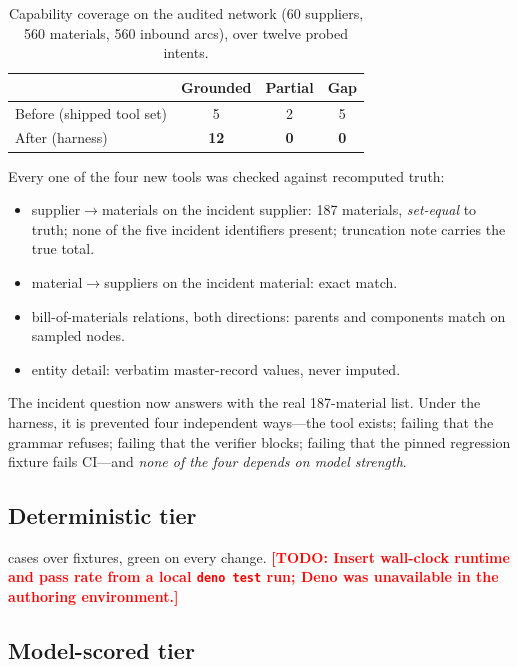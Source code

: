 \documentclass[conference]{IEEEtran}
\newcommand{\TODO}[1]{\textcolor{red}{\textbf{[TODO: #1]}}}
\begin{document}
\begin{table}[t]
\caption{Capability coverage on the audited network (60 suppliers, 560
         materials, 560 inbound arcs), over twelve probed intents.}
\label{tab:coverage}
\centering
\footnotesize
\begin{tabular}{@{}lccc@{}}
\toprule
& \textbf{Grounded} & \textbf{Partial} & \textbf{Gap} \\
\midrule
Before (shipped tool set) & 5  & 2 & 5 \\
After  (harness)          & \textbf{12} & \textbf{0} & \textbf{0} \\
\bottomrule
\end{tabular}
\end{table}

Every one of the four new tools was checked against recomputed truth:

\begin{itemize}
  \item supplier$\rightarrow$materials on the incident supplier: 187 materials,
        \emph{set-equal} to truth; none of the five incident identifiers present;
        truncation note carries the true total.
  \item material$\rightarrow$suppliers on the incident material: exact match.
  \item bill-of-materials relations, both directions: parents and components
        match on sampled nodes.
  \item entity detail: verbatim master-record values, never imputed.
\end{itemize}

The incident question now answers with the real 187-material list. Under the
harness, it is prevented four independent ways---the tool exists; failing that
the grammar refuses; failing that the verifier blocks; failing that the pinned
regression fixture fails CI---and \emph{none of the four depends on model
strength}.

\subsection{Deterministic tier}

\TestCount{} cases over \FixtureCount{} fixtures, green on every change.
\TODO{Insert wall-clock runtime and pass rate from a local \texttt{deno test}
run; Deno was unavailable in the authoring environment.}

\subsection{Model-scored tier}
\end{document}
